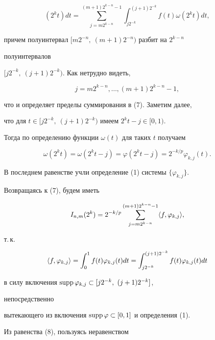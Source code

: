 \begin{pf}
\begin{equation}
(2^k t)dt=\sum^{(m+1)2^{k-n}-1}_{j=m2^{k-n}} 


\int^{(j+1)2^{-k}}_{j2^{-k}}f(t)\omega(2^k t)dt, 


\end{equation} 


причем полуинтервал $[m2^{-n},\ (m+1)2^{-n})$ разбит на $2^{k-n}$ 


полуинтервалов 


$[j2^{-k},\ (j+1)2^{-k})$. Как нетрудно видеть, 


$$ 


j=m2^{k-n},\dotsc,(m+1)2^{k-n}-1, 


$$ 


что и определяет пределы суммирования в (7). Заметим далее, 


что для $t\in[j2^{-k},\ (j+1)2^{-k})$ имеем $2^k t-j\in[0,1)$. 


Тогда по определению функции $\omega(t)$ для таких $t$ получаем 


$$ 


\omega(2^k t)=\omega(2^k t-j)=\varphi(2^k t-j)= 


2^{-k/p}\varphi_{k,j}(t). 


$$ 


В последнем равенстве учли определение (1) системы $\{\varphi_{k,j}\}$. 


Возвращаясь к (7), будем иметь 


\begin{equation} 


I_{n,m}(2^k)=2^{-k/p} 


\sum^{(m+1)2^{k-n}-1}_{j=m2^{k-n}}\la f,\varphi_{k,j}\ra, 


\end{equation} 


т.\,к.


\begin{equation} 


\la f,\varphi_{k,j}\ra=\int^1_0 f(t)\varphi_{k,j}(t)dt= 


\int^{(j+1)2^{-k}}_{j2^{-k}}f(t)\varphi_{k,j}(t)dt 


\end{equation} 


в силу включения $\supp\varphi_{k,j}\subset[j2^{-k},\ (j+1)2^{-k}]$, 


непосредственно 


вытекающего из включения $\operatorname{supp}\varphi\subset[0,1]$ и определения (1). 


Из равенства (8), пользуясь неравенством  



\end{pf}
